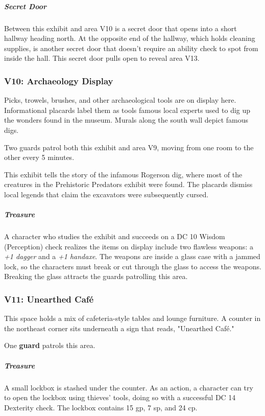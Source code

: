 \documentclass[10pt,a4paper,twoside,bg=print,twocolumn,openany,nodeprecatedcode]{dndbook}
\begin{document}
\subparagraph{Secret Door}
Between this exhibit and area V10 is a secret door that opens into a short hallway heading north. At the opposite end of the hallway, which holds cleaning supplies, is another secret door that doesn't require an ability check to spot from inside the hall. This secret door pulls open to reveal area V13.

\subsubsection{V10: Archaeology Display}
\begin{DndReadAloud}{}
Picks, trowels, brushes, and other archaeological tools are on display here. Informational placards label them as tools famous local experts used to dig up the wonders found in the museum. Murals along the south wall depict famous digs.

\end{DndReadAloud}

Two guards patrol both this exhibit and area V9, moving from one room to the other every 5 minutes.

This exhibit tells the story of the infamous Rogerson dig, where most of the creatures in the Prehistoric Predators exhibit were found. The placards dismiss local legends that claim the excavators were subsequently cursed.

\subparagraph{Treasure}
A character who studies the exhibit and succeeds on a DC 10 Wisdom (Perception) check realizes the items on display include two flawless weapons: a \textit{+1 dagger} and a \textit{+1 handaxe}. The weapons are inside a glass case with a jammed lock, so the characters must break or cut through the glass to access the weapons. Breaking the glass attracts the guards patrolling this area.

\subsubsection{V11: Unearthed Café}
\begin{DndReadAloud}{}
This space holds a mix of cafeteria-style tables and lounge furniture. A counter in the northeast corner sits underneath a sign that reads, "Unearthed Café."

\end{DndReadAloud}

One \textbf{guard} patrols this area.

\subparagraph{Treasure}
A small lockbox is stashed under the counter. As an action, a character can try to open the lockbox using thieves' tools, doing so with a successful DC 14 Dexterity check. The lockbox contains 15 gp, 7 sp, and 24 cp.
\end{document}
